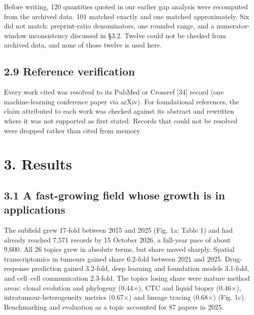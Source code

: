 \documentclass{article}
\begin{document}
Before writing, 120 quantities quoted in our earlier gap analysis were
recomputed from the archived data. 101 matched exactly and one matched
approximately. Six did not match: preprint-ratio denominators, one
rounded range, and a numerator-window inconsistency discussed in §3.2.
Twelve could not be checked from archived data, and none of those twelve
is used here.

\subsection{2.9 Reference verification}\label{reference-verification}

Every work cited was resolved to its PubMed or Crossref {[}34{]} record
(one machine-learning conference paper via arXiv). For foundational
references, the claim attributed to each work was checked against its
abstract and rewritten where it was not supported as first stated.
Records that could not be resolved were dropped rather than cited from
memory.

\section{3. Results}\label{results}

\subsection{3.1 A fast-growing field whose growth is in applications}\label{a-fast-growing-field-whose-growth-is-in-applications}

The subfield grew 17-fold between 2015 and 2025 (Fig. 1a; Table 1) and
had already reached 7,571 records by 15 October 2026, a full-year pace
of about 9,600. All 26 topics grew in absolute terms, but share moved
sharply. Spatial transcriptomics in tumours gained share 6.2-fold
between 2021 and 2025. Drug-response prediction gained 3.2-fold, deep
learning and foundation models 3.1-fold, and cell--cell communication
2.3-fold. The topics losing share were mature method areas: clonal
evolution and phylogeny (0.44×), CTC and liquid biopsy (0.46×),
intratumour-heterogeneity metrics (0.67×) and lineage tracing (0.68×)
(Fig. 1c). Benchmarking and evaluation as a topic accounted for 87
papers in 2025.
\end{document}
